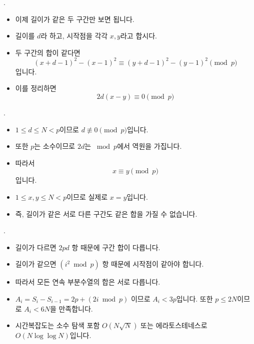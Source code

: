 \begin{frame}{\probno{}. \probtitle{}}
    \begin{itemize}
        \item 이제 길이가 같은 두 구간만 보면 됩니다.
        \item 길이를 $d$라 하고, 시작점을 각각 $x,y$라고 합시다.
        \item 두 구간의 합이 같다면
        \[
            (x+d-1)^2 - (x-1)^2 \equiv (y+d-1)^2 - (y-1)^2 \pmod p
        \]
        입니다.
        \item 이를 정리하면
        \[
            2d(x-y) \equiv 0 \pmod p
        \]
    \end{itemize}
\end{frame}

\begin{frame}{\probno{}. \probtitle{}}
    \begin{itemize}
        \item $1 \le d \le N < p$이므로 $d \not\equiv 0 \pmod p$입니다.
        \item 또한 $p$는 소수이므로 $2d$는 $\bmod p$에서 역원을 가집니다.
        \item 따라서
        \[
            x \equiv y \pmod p
        \]
        입니다.
        \item $1 \le x,y \le N < p$이므로 실제로 $x=y$입니다.
        \item 즉, 길이가 같은 서로 다른 구간도 같은 합을 가질 수 없습니다.
    \end{itemize}
\end{frame}

\begin{frame}{\probno{}. \probtitle{}}
    \begin{itemize}
        \item 길이가 다르면 $2pd$ 항 때문에 구간 합이 다릅니다.
        \item 길이가 같으면 $(i^2 \bmod p)$ 항 때문에 시작점이 같아야 합니다.
        \item 따라서 모든 연속 부분수열의 합은 서로 다릅니다.
        \item $A_i = S_i - S_{i-1} = 2p + (2i \bmod p)$ 이므로 $A_i < 3p$입니다. 또한 $p \le 2N$이므로 $A_i < 6N$을 만족합니다.
        \item 시간복잡도는 소수 탐색 포함 $O(N\sqrt N)$ 또는 에라토스테네스로 $O(N\log\log N)$입니다.
    \end{itemize}
\end{frame}